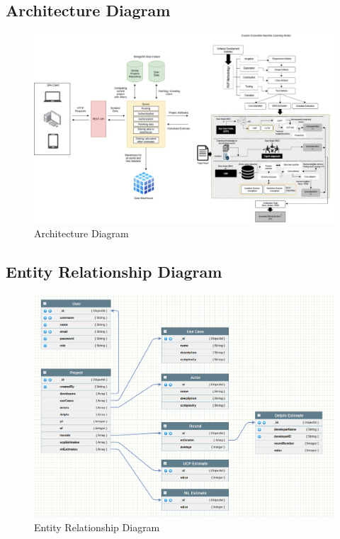 \subsection{Architecture Diagram}
\begin{figure}[H]
    \centering
    \includegraphics[scale=0.4]{./diagrams/architecture-diagram.jpeg}
    \caption{Architecture Diagram}
    \label{fig:arch-diag}

\end{figure}


\subsection{Entity Relationship Diagram}
\begin{figure}[H]
    \centering
    \includegraphics[scale=0.4]{./diagrams/ERD.png}
    \caption{Entity Relationship Diagram}
    \label{fig:er-diag}

\end{figure}


